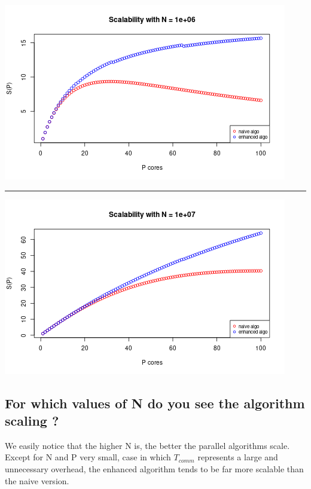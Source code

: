 \documentclass[
  10pt,
]{article}
\begin{document}
\begin{center}\includegraphics{figs/scalability_plots_naive_&_enhanced-3} \end{center}

\begin{center}\rule{0.5\linewidth}{0.5pt}\end{center}

\begin{center}\includegraphics{figs/scalability_plots_naive_&_enhanced-4} \end{center}

\hypertarget{for-which-values-of-n-do-you-see-the-algorithm-scaling}{%
\subsection{For which values of N do you see the algorithm scaling
?}\label{for-which-values-of-n-do-you-see-the-algorithm-scaling}}

We easily notice that the higher N is, the better the parallel
algorithms scale. Except for N and P very small, case in which
\(T_{comm}\) represents a large and unnecessary overhead, the enhanced
algorithm tends to be far more scalable than the naive version.
\end{document}
